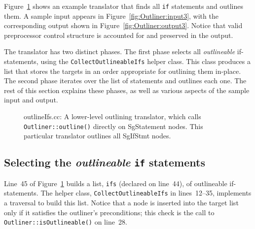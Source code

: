 Figure~\ref{fig:Outliner:direct} shows an example translator that
finds all \texttt{if} statements and outlines them. A sample input
appears in Figure~\ref{fig:Outliner:input3}, with the corresponding
output shown in Figure~\ref{fig:Outliner:output3}. Notice that
valid preprocessor control structure is accounted for and preserved in
the output.

The translator has two distinct phases. The first phase selects all
\emph{outlineable} if-statements, using the
\texttt{CollectOutlineableIfs} helper class. This class produces a
list that stores the targets in an order appropriate for outlining
them in-place. The second phase iterates over the list of statements
and outlines each one. The rest of this section explains these phases,
as well as various aspects of the sample input and output.

\begin{figure}[!h]
{\indent
{\mySmallFontSize
\begin{latexonly}
   
\end{latexonly}
\begin{htmlonly}
   
\end{htmlonly}

}
}
\caption{outlineIfs.cc: A lower-level outlining translator, which
calls \texttt{Outliner::outline()} directly on SgStatement
nodes. This particular translator outlines all SgIfStmt nodes.}
\label{fig:Outliner:direct}
\end{figure}

\subsection{Selecting the \emph{outlineable} \texttt{if} statements}
\label{sec:Outliner:direct:translator}

Line~45 of Figure~\ref{fig:Outliner:direct} builds a list,
\texttt{ifs} (declared on line~44), of outlineable if-statements.  The
helper class, \texttt{CollectOutlineableIfs} in lines~12--35,
implements a traversal to build this list. Notice that a node is
inserted into the target list only if it satisfies the outliner's
preconditions; this check is the call to
\texttt{Outliner::isOutlineable()} on line~28.

